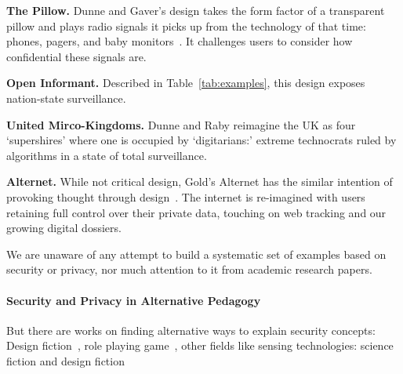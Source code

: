 \begin{compactlist}
\item \textbf{The Pillow.} Dunne and Gaver's design takes the form factor of a transparent pillow and plays radio signals it picks up from the technology of that time: \eg phones, pagers, and baby monitors~\cite{DuGa97}. It challenges users to consider how confidential these signals are.  
\item \textbf{Open Informant.} Described in Table~\ref{tab:examples}, this design exposes nation-state surveillance.
\item \textbf{United Mirco-Kingdoms.} Dunne and Raby reimagine the UK as four `supershires' where one is occupied by `digitarians:' extreme technocrats ruled by algorithms in a state of total surveillance.  
\item \textbf{Alternet.} While not critical design, Gold's Alternet has the similar intention of provoking thought through design~\cite{Gol14}. The internet is re-imagined with users retaining full control over their private data, touching on web tracking and our growing digital dossiers. 
\end{compactlist}

We are unaware of any attempt to build a systematic set of examples based on security or privacy, nor much attention to it from academic research papers. %


\paragraph{Security and Privacy in Alternative Pedagogy}

But there are works on finding alternative ways to explain security concepts: Design fiction~\cite{loureiro-koechlin_vision_2022}, role playing game~\cite{merrill_security_2020}, other fields like sensing technologies: science fiction and design fiction~\cite{wong_real-fictional_2017}


